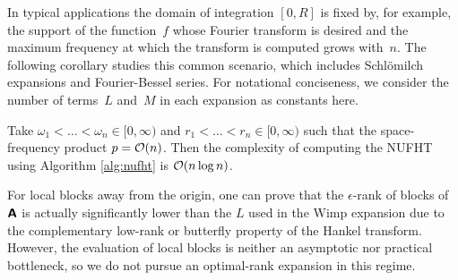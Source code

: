 In typical applications the domain of integration $[0,R]$ is fixed by, for
example, the support of the function~$f$ whose Fourier transform is desired and
the maximum frequency at which the transform is computed grows with~$n$. The
following corollary studies this common scenario, which includes Schl\"omilch
expansions and Fourier-Bessel series. For notational conciseness, we consider
the number of terms~$L$ and~$M$ in each expansion as constants here.
\begin{corollary}
  \label{cor:complexity} Take $\omega_1 < \dots < \omega_n \in
    [0,\infty)$ and $r_1 < \dots < r_n \in [0,\infty)$ such that the
    space-frequency product $p = \mathcal{O}(n)$. Then the complexity of computing the
    NUFHT using Algorithm \ref{alg:nufht} is $\mathcal{O}(n\log n)$.
\end{corollary}

\begin{remark}
  For local blocks away from the origin, one can prove that the $\epsilon$-rank
  of blocks of $\bm{\mathsf{A}}$ is actually significantly lower than the $L$ used in
  the Wimp expansion due to the complementary low-rank or butterfly property of
  the Hankel transform. However, the evaluation of local blocks is neither an
  asymptotic nor practical bottleneck, so we do not pursue an optimal-rank
  expansion in this regime.
\end{remark}



